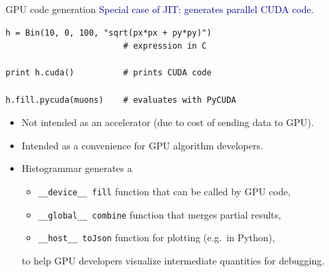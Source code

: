 \documentclass[aspectratio=169]{beamer}
\begin{document}
\begin{frame}[fragile]{GPU code generation}
\vspace{0.5 cm}
\textcolor{darkblue}{\large Special case of JIT: generates parallel CUDA code.}

\begin{center}
\begin{minipage}{0.7\linewidth}
\small
\begin{verbatim}
h = Bin(10, 0, 100, "sqrt(px*px + py*py)")
                        # expression in C

print h.cuda()          # prints CUDA code

h.fill.pycuda(muons)    # evaluates with PyCUDA
\end{verbatim}
\end{minipage}
\end{center}

\large
\begin{itemize}
\item<2-> Not intended as an accelerator (due to cost of sending data to GPU).
\item<3-> Intended as a convenience for GPU algorithm developers.
\item<4-> Histogrammar generates a
\begin{itemize}
\item {\tt \_\_device\_\_ fill} function that can be called by GPU code,
\item {\tt \_\_global\_\_ combine} function that merges partial results,
\item {\tt \_\_host\_\_ toJson} function for plotting (e.g.\ in Python),
\end{itemize}
to help GPU developers visualize intermediate quantities for debugging.
\end{itemize}
\end{frame}
\end{document}
